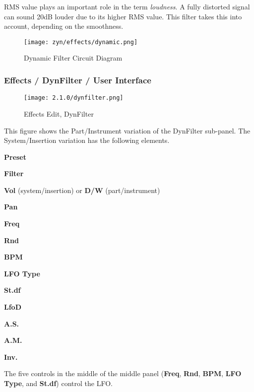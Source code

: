    RMS value plays an important role in the term \textsl{loudness}.
   A fully distorted signal can sound 20dB louder due to its higher RMS value.
   This filter takes this into account, depending on the smoothness.

\begin{figure}[H]
   \centering
   \texttt{[image: zyn/effects/dynamic.png]}
   \caption{Dynamic Filter Circuit Diagram}
   \label{fig:dynfilter_circuit_diagram}
\end{figure}

\subsubsection{Effects / DynFilter / User Interface}
\label{subsubsec:effects_edit_dynfilter_ui}

\begin{figure}[H]
   \centering
   \texttt{[image: 2.1.0/dynfilter.png]}
   \caption{Effects Edit, DynFilter}
   \label{fig:effects_edit_dynfilter}
\end{figure}

   This figure shows the Part/Instrument variation of the DynFilter sub-panel.
   The System/Insertion variation has the following elements.

   \begin{enumber}
      \item \textbf{Preset}
      \item \textbf{Filter}
      \item \textbf{Vol} (system/insertion) or \textbf{D/W} (part/instrument)
      \item \textbf{Pan}
      \item \textbf{Freq}
      \item \textbf{Rnd}
      \item \textbf{BPM}
      \item \textbf{LFO Type}
      \item \textbf{St.df}
      \item \textbf{LfoD}
      \item \textbf{A.S.}
      \item \textbf{A.M.}
      \item \textbf{Inv.}
   \end{enumber}

   The five controls in the middle of the middle panel
   (\textbf{Freq}, \textbf{Rnd}, \textbf{BPM}, \textbf{LFO Type}, and \textbf{St.df})
   control the LFO.

